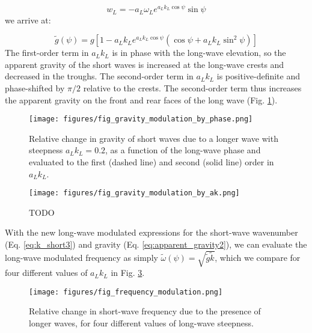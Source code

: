 \documentclass[draft]{agujournal2019}
\begin{document}
\begin{equation}
\label{eq:w_L}
w_L = - a_L \omega_L e^{a_L k_L \cos{\psi}} \sin{\psi}
\end{equation}
we arrive at:

\begin{equation}
\label{eq:apparent_gravity2}
\widetilde{g}(\psi) = g \left[
  1 - a_L k_L e^{a_L k_L \cos{\psi}} \left(
    \cos{\psi} + a_L k_L \sin^2{\psi}
  \right)
\right]
\end{equation}
The first-order term in $a_L k_L$ is in phase with the long-wave elevation,
so the apparent gravity of the short waves is increased at the long-wave crests
and decreased in the troughs.
The second-order term in $a_L k_L$ is positive-definite and phase-shifted by
$\pi/2$ relative to the crests.
The second-order term thus increases the apparent gravity on the front and rear
faces of the long wave (Fig. \ref{fig:apparent_gravity}).

\begin{figure}[h]
\label{fig:apparent_gravity}
\centering
\texttt{[image: figures/fig\_gravity\_modulation\_by\_phase.png]}
\caption{
  Relative change in gravity of short waves due to a longer wave with steepness $a_L k_L = 0.2$,
  as a function of the long-wave phase and evaluated to the first (dashed line) and second (solid line) order in $a_L k_L$.
}
\end{figure}

\begin{figure}[h]
\label{fig:gravity_modulation_vs_ak}
\centering
\texttt{[image: figures/fig\_gravity\_modulation\_by\_ak.png]}
\caption{
  TODO
}
\end{figure}

With the new long-wave modulated expressions for the short-wave wavenumber
(Eq. \ref{eq:k_short3}) and gravity (Eq. \ref{eq:apparent_gravity2}), we can
evaluate the long-wave modulated frequency as simply
$\widetilde{\omega}(\psi) = \sqrt{\widetilde{g} \widetilde{k}}$, which we compare
for four different values of $a_L k_L$ in Fig. \ref{fig:frequency_modulation}.

\begin{figure}[h]
\label{fig:frequency_modulation}
\centering
\texttt{[image: figures/fig\_frequency\_modulation.png]}
\caption{
  Relative change in short-wave frequency due to the presence of longer
  waves, for four different values of long-wave steepness.
}
\end{figure}
\end{document}
